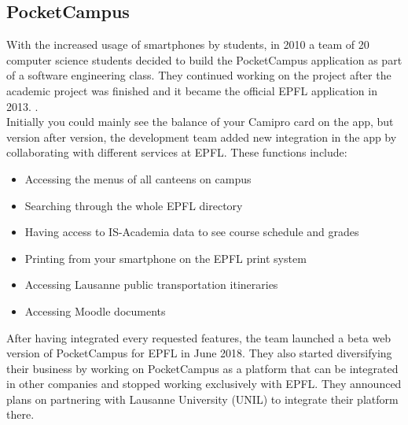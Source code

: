 \documentclass[11pt,a4paper]{report}
\begin{document}
\subsection{PocketCampus}
With the increased usage of smartphones by students, in 2010 a team of 20 computer science students decided to build the PocketCampus application as part of a software engineering class. They continued working on the project after the academic project was finished and it became the official EPFL application in 2013. \cite{camipro:creation}. \\

Initially you could mainly see the balance of your Camipro card on the app, but version after version, the development team added new integration in the app by collaborating with different services at EPFL.
These functions include:
\begin{itemize}
    \item Accessing the menus of all canteens on campus
    \item Searching through the whole EPFL directory
    \item Having access to IS-Academia data to see course schedule and grades
    \item Printing from your smartphone on the EPFL print system
    \item Accessing Lausanne public transportation itineraries
    \item Accessing Moodle documents
\end{itemize}

After having integrated every requested features, the team launched a beta web version of PocketCampus for EPFL in June 2018. They also started diversifying their business by working on PocketCampus as a platform that can be integrated in other companies and stopped working exclusively with EPFL. They announced plans on partnering with Lausanne University (UNIL) to integrate their platform there.
\end{document}
